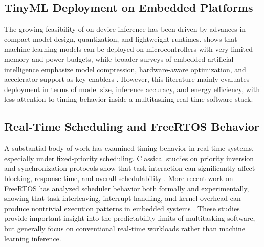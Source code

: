\documentclass[conference]{IEEEtran}
\begin{document}
\subsection{TinyML Deployment on Embedded Platforms}
The growing feasibility of on-device inference has been driven by advances in compact model design, quantization, and lightweight runtimes. \cite{warden2020tinyml} shows that machine learning models can be deployed on microcontrollers with very limited memory and power budgets, while broader surveys of embedded artificial intelligence emphasize model compression, hardware-aware optimization, and accelerator support as key enablers \cite{zhang2023embeddedai}. However, this literature mainly evaluates deployment in terms of model size, inference accuracy, and energy efficiency, with less attention to timing behavior inside a multitasking real-time software stack.

\subsection{Real-Time Scheduling and FreeRTOS Behavior}

A substantial body of work has examined timing behavior in real-time systems, especially under fixed-priority scheduling. Classical studies on priority inversion and synchronization protocols show that task interaction can significantly affect blocking, response time, and overall schedulability \cite{sha1990priority,davari1992unbounded}. More recent work on FreeRTOS has analyzed scheduler behavior both formally and experimentally, showing that task interleaving, interrupt handling, and kernel overhead can produce nontrivial execution patterns in embedded systems \cite{lin2022spin,miranda2020overheads}. These studies provide important insight into the predictability limits of multitasking software, but generally focus on conventional real-time workloads rather than machine learning inference.
\end{document}
